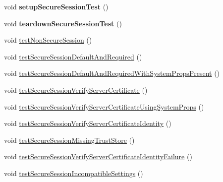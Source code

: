 \begin{DoxyCompactItemize}
\item 
\mbox{\label{classtestsuite_1_1x_1_1devapi_1_1_secure_session_test_a531c9ad1af18dfd3fd69ac42d16c8763}} 
void {\bfseries setup\+Secure\+Session\+Test} ()
\item 
\mbox{\label{classtestsuite_1_1x_1_1devapi_1_1_secure_session_test_a7d598e38db5228b2bd1d4e54ad13b8aa}} 
void {\bfseries teardown\+Secure\+Session\+Test} ()
\item 
void \mbox{\hyperlink{classtestsuite_1_1x_1_1devapi_1_1_secure_session_test_a76ccf1c3aa50c554feb81ea94f045f10}{test\+Non\+Secure\+Session}} ()
\item 
void \mbox{\hyperlink{classtestsuite_1_1x_1_1devapi_1_1_secure_session_test_a5339a158249ecdd744cbbca9baba9831}{test\+Secure\+Session\+Default\+And\+Required}} ()
\item 
void \mbox{\hyperlink{classtestsuite_1_1x_1_1devapi_1_1_secure_session_test_aed029a480742775392f0eea63e983b75}{test\+Secure\+Session\+Default\+And\+Required\+With\+System\+Props\+Present}} ()
\item 
void \mbox{\hyperlink{classtestsuite_1_1x_1_1devapi_1_1_secure_session_test_a36e8f659ede8006469fcc4821f8b9c7f}{test\+Secure\+Session\+Verify\+Server\+Certificate}} ()
\item 
void \mbox{\hyperlink{classtestsuite_1_1x_1_1devapi_1_1_secure_session_test_a770903a4a44c09acce0868ce8fbeb167}{test\+Secure\+Session\+Verify\+Server\+Certificate\+Using\+System\+Props}} ()
\item 
void \mbox{\hyperlink{classtestsuite_1_1x_1_1devapi_1_1_secure_session_test_a13ab9c1584ea928054cec28d5c1157e1}{test\+Secure\+Session\+Verify\+Server\+Certificate\+Identity}} ()
\item 
void \mbox{\hyperlink{classtestsuite_1_1x_1_1devapi_1_1_secure_session_test_aae0c8809c0ecd1323484109112fc2fc1}{test\+Secure\+Session\+Missing\+Trust\+Store}} ()
\item 
void \mbox{\hyperlink{classtestsuite_1_1x_1_1devapi_1_1_secure_session_test_a92a3f1a5a9c4a0f49b26b8eef7bcf1c2}{test\+Secure\+Session\+Verify\+Server\+Certificate\+Identity\+Failure}} ()
\item 
void \mbox{\hyperlink{classtestsuite_1_1x_1_1devapi_1_1_secure_session_test_a7cc008292c6b4678f2354b207f0ce30b}{test\+Secure\+Session\+Incompatible\+Settings}} ()

\end{DoxyCompactItemize}
